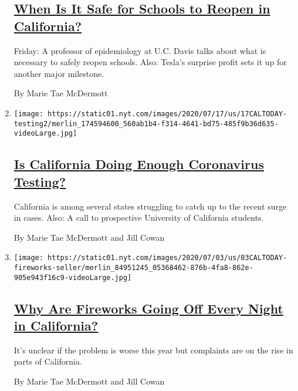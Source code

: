 \begin{enumerate}
  \hypertarget{when-is-it-safe-for-schools-to-reopen-in-california}{%
  \subsection{\texorpdfstring{\href{/2020/07/24/us/ca-schools-reopening.html}{When
  Is It Safe for Schools to Reopen in
  California?}}{When Is It Safe for Schools to Reopen in California?}}\label{when-is-it-safe-for-schools-to-reopen-in-california}}

  Friday: A professor of epidemiology at U.C. Davis talks about what is
  necessary to safely reopen schools. Also: Tesla's surprise profit sets
  it up for another major milestone.

  By Marie Tae McDermott
\item
  \texttt{[image: https://static01.nyt.com/images/2020/07/17/us/17CALTODAY-testing2/merlin\_174594600\_560ab1b4-f314-4641-bd75-485f9b36d635-videoLarge.jpg]}

  \hypertarget{is-california-doing-enough-coronavirus-testing}{%
  \subsection{\texorpdfstring{\href{/2020/07/17/us/ca-coronavirus-covid-testing.html}{Is
  California Doing Enough Coronavirus
  Testing?}}{Is California Doing Enough Coronavirus Testing?}}\label{is-california-doing-enough-coronavirus-testing}}

  California is among several states struggling to catch up to the
  recent surge in cases. Also: A call to prospective University of
  California students.

  By Marie Tae McDermott and Jill Cowan
\item
  \texttt{[image: https://static01.nyt.com/images/2020/07/03/us/03CALTODAY-fireworks-seller/merlin\_84951245\_05368462-876b-4fa8-862e-905e943f16c9-videoLarge.jpg]}

  \hypertarget{why-are-fireworks-going-off-every-night-in-california}{%
  \subsection{\texorpdfstring{\href{/2020/07/03/us/fireworks-every-night-ca.html}{Why
  Are Fireworks Going Off Every Night in
  California?}}{Why Are Fireworks Going Off Every Night in California?}}\label{why-are-fireworks-going-off-every-night-in-california}}

  It's unclear if the problem is worse this year but complaints are on
  the rise in parts of California.

  By Marie Tae McDermott and Jill Cowan
\end{enumerate}

